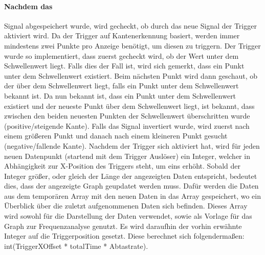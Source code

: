 \documentclass{article}
\begin{document}
\paragraph{Nachdem das}
Signal abgespeichert wurde, wird gecheckt, ob durch das neue Signal der Trigger aktiviert wird. Da der Trigger auf Kantenerkennung basiert, werden immer mindestens zwei Punkte pro Anzeige benötigt, um diesen zu triggern.
Der Trigger wurde so implementiert, dass zuerst gecheckt wird, ob der Wert unter dem Schwellenwert liegt. Falls dies der Fall ist, wird sich gemerkt, dass ein Punkt unter dem Schwellenwert existiert. Beim nächsten Punkt wird dann geschaut, ob der über dem Schwellenwert liegt, falls ein Punkt unter dem Schwellenwert bekannt ist. Da nun bekannt ist, dass ein Punkt unter dem Schwellenwert existiert und der neueste Punkt über dem Schwellenwert liegt, ist bekannt, dass zwischen den beiden neuesten Punkten der Schwellenwert überschritten wurde (positive/steigende Kante). Falls das Signal invertiert wurde, wird zuerst nach einem größeren Punkt und danach nach einem kleineren Punkt gesucht (negative/fallende Kante).
Nachdem der Trigger sich aktiviert hat, wird für jeden neuen Datenpunkt (startend mit dem Trigger Auslöser) ein Integer, welcher in Abhängigkeit zur X-Position des Triggers steht, um eins erhöht. Sobald der Integer größer, oder gleich der Länge der angezeigten Daten entspricht, bedeutet dies, dass der angezeigte Graph geupdatet werden muss. Dafür werden die Daten aus dem temporären Array mit den neuen Daten in das Array gespeichert, wo ein Überblick über die zuletzt aufgenommenen Daten sich befinden. Dieses Array wird sowohl für die Darstellung der Daten verwendet, sowie als Vorlage für das Graph zur Frequenzanalyse genutzt.
Es wird daraufhin der vorhin erwähnte Integer auf die Triggerposition gesetzt. Diese berechnet sich folgendermaßen: 
int(TriggerXOffset * totalTime * Abtastrate). 
\end{document}
